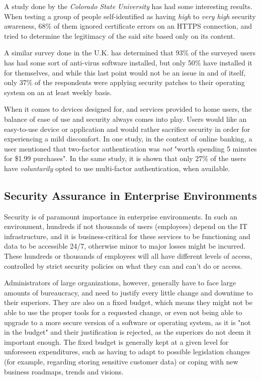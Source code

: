 \documentclass[a4paper,12pt]{article}
\begin{document}
	A study done by the \textit{Colorado State University} has had some interesting\cite{ahowe12} results. When testing a group of people self-identified as having \textit{high} to \textit{very high} security awareness, 68\% of them ignored certificate errors on an HTTPS connection, and tried to determine the legitimacy of the said site based only on its content.
	
	A similar survey done in the U.K. has determined\cite{sfurnell07} that 93\% of the surveyed users has had some sort of anti-virus software installed, but only 50\% have installed it for themselves, and while this last point would not be an issue in and of itself, only 37\% of the respondents were applying security patches to their operating system on an at least weekly basis.
	
	When it comes to devices designed for, and services provided to home users, the balance of ease of use and security always comes into play. Users would like an easy-to-use device or application and would rather sacrifice security in order for experiencing a mild discomfort. In one study, in the context of online banking, a user mentioned that two-factor authentication was \textit{not} "worth spending 5 minutes for \$1.99 purchases"\cite{ecrist14}. In the same study, it is shown that only 27\% of the users have \textit{voluntarily} opted to use multi-factor authentication, when available.
	
\subsection{Security Assurance in Enterprise Environments}

	Security is of paramount importance in enterprise environments. In such an environment, hundreds if not thousands of users (employees) depend on the IT infrastructure, and it is business-critical for these services to be functioning and data to be accessible 24/7, otherwise minor to major losses might be incurred. These hundreds or thousands of employees will all have different levels of access, controlled by strict security policies on what they can and can't do or access.
	
	Administrators of large organizations, however, generally have to face large amounts of bureaucracy, and need to justify every little change and downtime to their superiors. They are also on a fixed budget, which means they might not be able to use the proper tools for a requested change, or even not being able to upgrade to a more secure version of a software or operating system, as it is "not in the budget" and their justification is rejected, as the superiors do not deem it important enough. The fixed budget is generally kept at a given level for unforeseen expenditures, such as having to adapt to possible legislation changes (for example, regarding storing sensitive customer data) or coping with new business roadmaps, trends and visions.\cite{gkreiz06}
	
\end{document}
